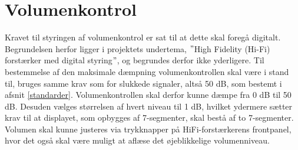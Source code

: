 \section{Volumenkontrol}
\label{valg_volumenkontrol}
Kravet til styringen af volumenkontrol er sat til at dette skal foregå digitalt. Begrundelsen herfor ligger i projektets undertema, $"$High Fidelity (Hi-Fi) forstærker med digital styring$"$, og begrundes derfor ikke yderligere. Til bestemmelse af den maksimale dæmpning volumenkontrollen skal være i stand til, bruges samme krav som for slukkede signaler, altså 50 dB, som bestemt i afsnit \ref{standarder}. Volumenkontrollen skal derfor kunne dæmpe fra  0 dB til 50 dB. Desuden vælges størrelsen af hvert niveau til 1 dB, hvilket ydermere sætter krav til at displayet, som opbygges af 7-segmenter, skal bestå af to 7-segmenter.\\
Volumen skal kunne justeres via trykknapper på HiFi-forstærkerens frontpanel, hvor det også skal være muligt at aflæse det øjeblikkelige volumenniveau.  
